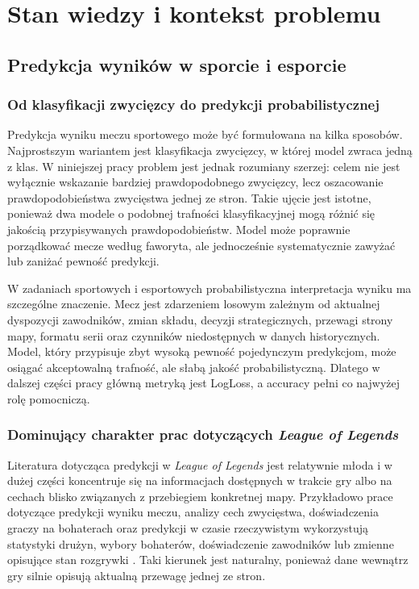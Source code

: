 \chapter{Stan wiedzy i kontekst problemu}

\section{Predykcja wyników w sporcie i esporcie}

\subsection{Od klasyfikacji zwycięzcy do predykcji probabilistycznej}

Predykcja wyniku meczu sportowego może być formułowana na kilka sposobów. Najprostszym wariantem
jest klasyfikacja zwycięzcy, w której model zwraca jedną z klas. W niniejszej pracy problem jest
jednak rozumiany szerzej: celem nie jest wyłącznie wskazanie bardziej prawdopodobnego zwycięzcy,
lecz oszacowanie prawdopodobieństwa zwycięstwa jednej ze stron. Takie ujęcie jest istotne, ponieważ
dwa modele o podobnej trafności klasyfikacyjnej mogą różnić się jakością przypisywanych
prawdopodobieństw. Model może poprawnie porządkować mecze według faworyta, ale jednocześnie
systematycznie zawyżać lub zaniżać pewność predykcji.

W zadaniach sportowych i esportowych probabilistyczna interpretacja wyniku ma szczególne znaczenie.
Mecz jest zdarzeniem losowym zależnym od aktualnej dyspozycji zawodników, zmian składu, decyzji
strategicznych, przewagi strony mapy, formatu serii oraz czynników niedostępnych w danych
historycznych. Model, który przypisuje zbyt wysoką pewność pojedynczym predykcjom, może osiągać
akceptowalną trafność, ale słabą jakość probabilistyczną. Dlatego w dalszej części pracy główną
metryką jest LogLoss, a accuracy pełni co najwyżej rolę pomocniczą.

\subsection{Dominujący charakter prac dotyczących \textit{League of Legends}}

Literatura dotycząca predykcji w \textit{League of Legends} jest relatywnie młoda i w dużej części
koncentruje się na informacjach dostępnych w trakcie gry albo na cechach blisko związanych z
przebiegiem konkretnej mapy. Przykładowo prace dotyczące predykcji wyniku meczu, analizy cech
zwycięstwa, doświadczenia graczy na bohaterach oraz predykcji w czasie rzeczywistym wykorzystują
statystyki drużyn, wybory bohaterów, doświadczenie zawodników lub zmienne opisujące stan rozgrywki
\parencite{lin2016lol,costa2021lol,do2021championExperience,junior2023lol}. Taki kierunek jest
naturalny, ponieważ dane wewnątrz gry silnie opisują aktualną przewagę jednej ze stron.

